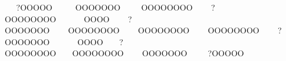          ? O O O O O           O O O O O O O          O O O O O O O O         ? O O O O O O O O             O O O O         ? O O O O O O O         O O O O O O O O         O O O O O O O O         O O O O O O O O         ? O O O O O O O             O O O O        ? O O O O O O O O        O O O O O O O O         O O O O O O O          ? O O O O O                                                                                                                                                                                                                                                                                        